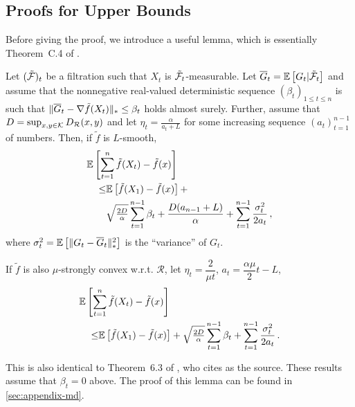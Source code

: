\subsection{Proofs for Upper Bounds}
\label{sec:ub-proof}

Before giving the proof, we introduce a useful lemma, which is essentially Theorem~C.4 of \cite{MahdaviPhd:2014}.
\begin{lemma}
\label{lem:ub}
Let $({\tilde{\mathcal{F}}})_{t}$ be a filtration such that $X_t$ is ${\tilde{\mathcal{F}}}_t$-measurable.
Let $\overline G_t = \mathbb{E}\left[G_t|{\tilde{\mathcal{F}}}_t\right]$ 
and assume that the nonnegative real-valued deterministic sequence $(\beta_t)_{1\le t\le n}$ is such that 
$\|\overline G_t - \nabla \tilde{f}(X_t)\|_* \le \beta_t$ holds almost surely. 
Further, assume that $D=\sup_{x,y\in \mathcal{K}} D_{\mathcal{R}}(x,y)$ and let $\eta_t = \frac{\alpha}{a_t+L}$ for some increasing 
sequence $(a_t)_{t=1}^{n-1}$ of numbers. Then, if $\tilde{f}$ is $L$-smooth,
\begin{align*}
\MoveEqLeft \EE{ \sum_{t=1}^n \tilde{f}(X_t) - \tilde{f}(x) }  \\
\le& 	 \EE{\tilde{f}(X_1)-\tilde{f}(x)}+ \\
 & \sqrt{\tfrac{2D}{\alpha}} \sum_{t=1}^{n-1} \beta_t 
 +\frac{D(a_{n-1}+L)}{\alpha} +
	  \sum_{t=1}^{n-1}\frac{\sigma_t^2}{2a_t}\,,
\end{align*}
where $\sigma_t^2 = \mathbb{E}\left[ \|G_t-\overline G_t\|_*^2\right]$ is the ``variance'' of $G_t$.

If ${\tilde{f}}$ is also $\mu$-strongly convex w.r.t. $\mathcal{R}$, let $\eta_t = \dfrac{2}{\mu t}$, $a_t = \dfrac{\alpha \mu}{2}t-L$,
\begin{align*}
\MoveEqLeft \EE{ \sum_{t=1}^n \tilde{f}(X_t) - \tilde{f}(x) }  \\
\le& 	 \EE{\tilde{f}(X_1)-\tilde{f}(x)}+ 
 \sqrt{\tfrac{2D}{\alpha}} \sum_{t=1}^{n-1} \beta_t 
 +\sum_{t=1}^{n-1}\frac{\sigma_t^2}{2a_t}\,.
\end{align*}
\end{lemma}
This is also identical to Theorem~6.3 of \cite{Bu:Convex14}, who cites \cite{Dekel:minibatch12} as the source. These results assume that $\beta_t=0$ above.
The proof of this lemma can be found in \cref{sec:appendix-md}.

